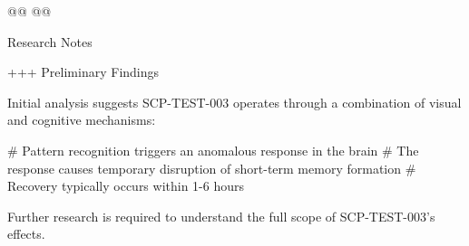 @@ @@


Research Notes

\begin{scpquote}
+++ Preliminary Findings

Initial analysis suggests SCP-TEST-003 operates through a combination of visual and cognitive mechanisms:

\# Pattern recognition triggers an anomalous response in the brain
\# The response causes temporary disruption of short-term memory formation
\# Recovery typically occurs within 1-6 hours

Further research is required to understand the full scope of SCP-TEST-003's effects.
\end{scpquote}

